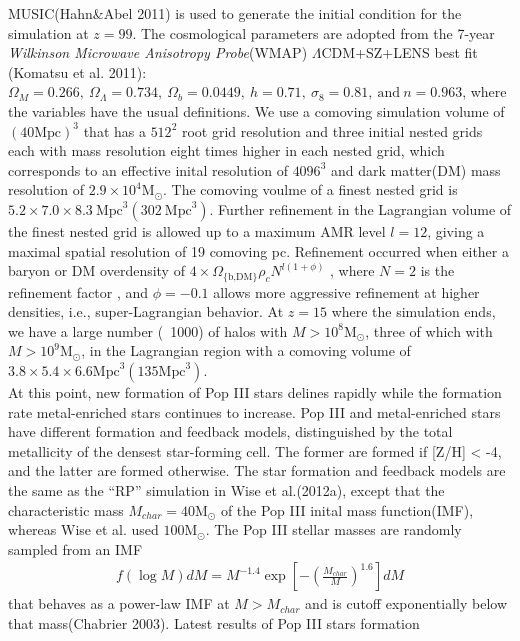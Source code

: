 \documentclass[useAMS,usenatbib]{mn2e}
\begin{document}
MUSIC(Hahn\&Abel 2011) is used to generate the initial condition for the
simulation at $z=99$. The cosmological parameters are adopted from the 7-year
\textit{Wilkinson Microwave Anisotropy Probe}(WMAP) $\Lambda\mbox{CDM}$+SZ+LENS
best fit (Komatsu et al. 2011):$\Omega_M=0.266, \ \Omega_{\Lambda}=0.734,\
\Omega_b=0.0449,\ h = 0.71,\ \sigma_8=0.81,\ \mbox{and}\ n=0.963$, where the
variables have the usual definitions. We use a comoving simulation volume of
$(40\mbox{Mpc})^3$ that has a $512^2$ root grid resolution and three initial
nested grids each with mass resolution eight times higher in each nested grid,
which corresponds to an effective inital resolution of $4096^3$ and dark
matter(DM) mass resolution of $2.9\times 10^4\mbox{M}_{\odot}$. The
comoving voulme of a finest nested grid is $5.2\times 7.0 \times 8.3\ 
\mbox{Mpc}^3(302\ \mbox{Mpc}^3)$. Further refinement in the Lagrangian volume of
the finest nested grid is allowed up to a maximum AMR level $l = 12$, giving a
maximal spatial resolution of 19 comoving pc. Refinement occurred when either a
baryon or DM overdensity of $4\times\Omega_{\{\textrm{b,DM\}}}\rho_cN^{l(1+\phi)}$
, where $N=2$ is the refinement factor , and $\phi=-0.1$ allows more aggressive
refinement at higher densities, i.e., super-Lagrangian behavior. At $z=15$
where the simulation ends, we have a large number (~1000) of halos with
$M>10^8\mbox{M}_\odot$, three of which with $M>10^9\mbox{M}_\odot$, in the
Lagrangian region with a comoving volume of 
$3.8\times5.4\times6.6\mbox{Mpc}^3(135\mbox{Mpc}^3)$. \\
At this point, new formation of Pop III stars delines rapidly while the
formation rate metal-enriched stars continues to increase. Pop III and
metal-enriched stars have different formation and feedback models, distinguished
by the total metallicity of the densest star-forming cell. The former are formed
if [Z/H] < -4, and the latter are formed otherwise. The star formation and
feedback models are the same as the ``RP'' simulation in Wise et al.(2012a),
except that the characteristic mass $M_{char} = 40\mbox{M}_{\odot}$ of the Pop
III inital mass function(IMF), whereas Wise et al. used $100\mbox{M}_{\odot}$.
The Pop III stellar masses are randomly sampled from an IMF
\begin{gather}
  f(\log M)dM =
  M^{-1.4}\exp\left[-\left(\frac{M_{char}}{M}\right)^{1.6}\right]dM
\end{gather}
that behaves as a power-law IMF at $M > M_{char}$ and is cutoff exponentially
below that mass(Chabrier 2003). Latest results of Pop III stars formation
\end{document}
